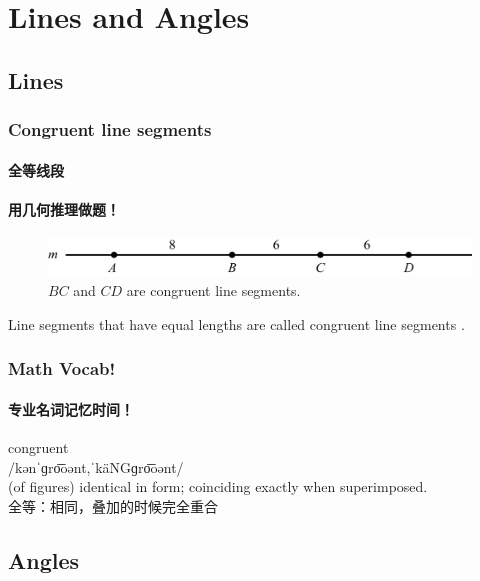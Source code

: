\documentclass[
	11pt, %
	handout,
]{beamer}
\begin{document}

\section{Lines and Angles}


\subsection{Lines}


\begin{frame}
	\frametitle{Congruent line segments} %
	\framesubtitle{全等线段}
	\framesubtitle{用几何推理做题！}
		\begin{figure}
			\includegraphics[width=\linewidth]{Lines.jpg}
			\caption{$BC$ and $CD$ are congruent line segments.}
		\end{figure}

		\begin{definition}
		Line segments that have equal lengths are called \alert{congruent line segments} .
		\end{definition}
\end{frame}


\begin{frame}
	\frametitle{Math Vocab!} %
	\framesubtitle{专业名词记忆时间！}
	
	{\Huge congruent}\\
	{\LARGE /kənˈɡro͞oənt,ˈkäNGɡro͞oənt/\\
		\bigskip\bigskip
	(of figures) identical in form; coinciding exactly when superimposed. \\ 
	全等：相同，叠加的时候完全重合}

\end{frame}




\subsection{Angles}
\end{document}
